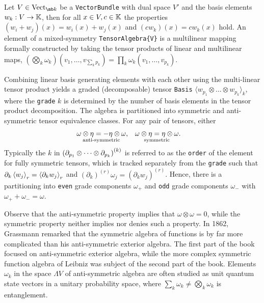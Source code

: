 \documentclass{juliacon}
\begin{document}
\begin{definition}
	Let $V\in\text{Vect}_{\mb k}$ be a \verb`VectorBundle` with dual space $V'$ and the basis elements $w_k:V\rightarrow\mathbb{K}$, then for all $x\in V,c\in\mathbb{K}$ the properties $(w_i+w_j)(x) = w_i(x)+w_j(x)$ and $(cw_k)(x) = cw_k(x)$ hold.
	An element of a mixed-symmetry \verb`TensorAlgebra{V}` is a multilinear mapping formally constructed by taking the tensor products of linear and multilinear maps,
	$(\bigotimes_k \omega_k)(v_1,\dots,v_{\sum_k p_k}) = \prod_k \omega_k(v_1,\dots,v_{p_k})$.
\end{definition}
\begin{definition}
	Combining linear basis generating elements with each other using the multi-linear tensor product yields a graded (decomposable) tensor \verb`Basis` $\langle w_{p_1}\otimes\dots\otimes w_{p_k}\rangle_k$, where the \verb`grade` $k$ is determined by the number of basis elements in the tensor product decomposition.
	The algebra is partitioned into symmetric and anti-symmetric tensor equivalence classes.
	For any pair of tensors, either
	\begin{align*}
		&\underset{\text{anti-symmetric}}{\omega\otimes\eta = -\eta\otimes\omega}, & &\underset{\text{symmetric}}{\omega\otimes\eta = \eta\otimes\omega}.
	\end{align*}
	Typically the $k$ in $\left(\partial_{p_1}\otimes\cdots\otimes\partial_{p_k}\right)^{(k)}$ is referred to as the \verb`order` of the element for fully symmetric tensors, which is tracked separately from the \verb`grade` such that $\partial_k\left\langle w_j \right\rangle_r = \left\langle \partial_kw_j \right\rangle_r$ and $(\partial_k)^{(r)}\omega_j = (\partial_kw_j)^{(r)}$.
	Hence, there is a partitioning into \verb`even` grade components $\omega_+$ and \verb`odd` grade components $\omega_-$ with $\omega_++\omega_-=\omega$.
\end{definition}
\begin{remark}
	Observe that the anti-symmetric property implies that $\omega\otimes\omega=0$, while the symmetric property neither implies nor denies such a property.
	In 1862, Grassmann remarked \cite{grassmann-2} that the symmetric algebra of functions is by far more complicated than his anti-symmetric exterior algebra.
	The first part of the book focused on anti-symmetric exterior algebra, while the more complex symmetric function algebra of Leibniz was subject of the second part of the book.
	Elements $\omega_k$ in the space $\Lambda V$ of anti-symmetric algebra are often studied as unit quantum state vectors in a unitary probability space, where $\sum_k\omega_k\neq\bigotimes_k\omega_k$ is entanglement.
\end{remark}
\end{document}

